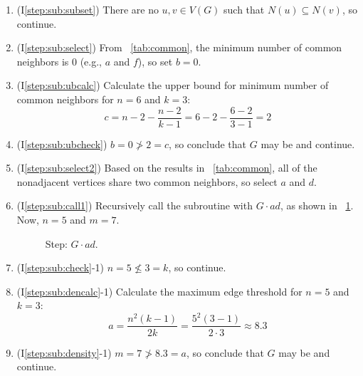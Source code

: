 \begin{enumerate}
\item (I\ref{step:sub:subset}) There are no \(u,v\in V(G)\) such that \(N(u)\subseteq N(v)\), so continue.

\item (I\ref{step:sub:select}) From \tablename~\ref{tab:common}, the minimum number of common neighbors is 0
  (e.g., \(a\) and \(f\)), so set \(b=0\).

\item (I\ref{step:sub:ubcalc}) Calculate the upper bound for minimum number of common neighbors for \(n=6\) and
  \(k=3\):
  \[c=n-2-\frac{n-2}{k-1}=6-2-\frac{6-2}{3-1}=2\]

\item (I\ref{step:sub:ubcheck}) \(b=0\ngtr2=c\), so conclude that \(G\) may be  and continue.

\item (I\ref{step:sub:select2}) Based on the results in \tablename~\ref{tab:common}, all of the nonadjacent
  vertices share two common neighbors, so select \(a\) and \(d\).

\item (I\ref{step:sub:call1}) Recursively call the subroutine with \(G\cdot ad\), as shown in
  \figurename~\ref{fig:contractad}.  Now, \(n=5\) and \(m=7\).

  \begin{figure}[H]
    \centering
    \caption{Step: \(G\cdot ad\).}
    \label{fig:contractad}
  \end{figure}

\item (I\ref{step:sub:check}-1) \(n=5\nleq3=k\), so continue.

\item (I\ref{step:sub:dencalc}-1) Calculate the maximum edge threshold for \(n=5\) and \(k=3\):
  \[a=\frac{n^2(k-1)}{2k}=\frac{5^2(3-1)}{2\cdot3}\approx8.3\]

\item (I\ref{step:sub:density}-1) \(m=7\ngtr8.3=a\), so conclude that \(G\) may be  and continue.
  

\end{enumerate}
